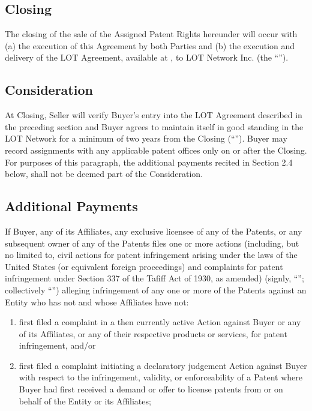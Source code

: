 \documentclass[letterpaper,10pt,english]{sphinxmanual}
\begin{document}
\subsection{Closing}
\label{\detokenize{2-delivery:closing}}
The closing of the sale of the Assigned Patent Rights hereunder will occur with (a) the execution of this Agreement by both Parties and (b) the execution and delivery of the LOT Agreement, available at , to LOT Network Inc. (the “”).


\subsection{Consideration}
\label{\detokenize{2-delivery:consideration}}
At Closing, Seller will verify Buyer’s entry into the LOT Agreement described in the preceding section and Buyer agrees to maintain itself in good standing in the LOT Network for a minimum of two years from the Closing (“”). Buyer may record assignments with any applicable patent offices only on or after the Closing. For purposes of this paragraph, the additional payments recited in Section 2.4 below, shall not be deemed part of the Consideration.


\subsection{Additional Payments}
\label{\detokenize{2-delivery:additional-payments}}
If Buyer, any of its Affiliates, any exclusive licensee of any of the Patents, or any subsequent owner of any of the Patents files one or more actions (including, but no limited to, civil actions for patent infringement arising under the laws of the United States (or equivalent foreign proceedings) and complaints for patent infringement under Section 337 of the Tafiff Act of 1930, as amended) (signly, “”; collectively “”) alleging infringement of any one or more of the Patents against an Entity who has not and whose Affiliates have not:
\begin{enumerate}
\def\theenumi{\alph{enumi}}
\def\labelenumi{(\theenumi )}
\makeatletter\def\p@enumii{\p@enumi (\theenumi )}\makeatother
\item {} 
first filed a complaint in a then currently active Action against Buyer or any of its Affiliates, or any of their respective products or services, for patent infringement, and/or

\item {} 
first filed a complaint initiating a declaratory judgement Action against Buyer with respect to the infringement, validity, or enforceability of a Patent where Buyer had first received a demand or offer to license patents from or on behalf of the Entity or its Affiliates;

\end{enumerate}
\end{document}
